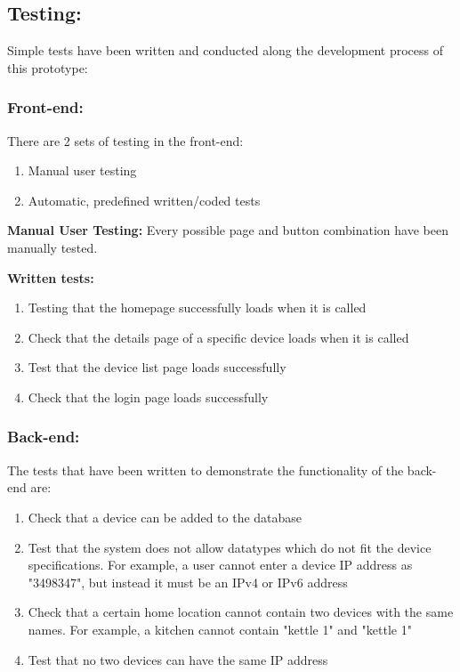 \documentclass[10pt,twocolumn]{witseiepaper}
\begin{document}
	\subsection{Testing:}
	Simple tests have been written and conducted along the development process of this prototype: 
	
	\subsubsection{Front-end:}
	There are 2 sets of testing in the front-end: 
	\begin{enumerate}
		\item Manual user testing
		\item Automatic, predefined written/coded tests
	\end{enumerate}
	
	\textbf{Manual User Testing:}
	Every possible page and button combination have been manually tested. 
	
	\textbf{Written tests:}
	\begin{enumerate}
		\item Testing that the homepage successfully loads when it is called
		\item Check that the details page of a specific device loads when it is called
		\item Test that the device list page loads successfully
		\item Check that the login page loads successfully
	\end{enumerate}	
	
	\subsubsection{Back-end:}
	The tests that have been written to demonstrate the functionality of the back-end are: 
	\begin{enumerate}
		\item Check that a device can be added to the database
		\item Test that the system does not allow datatypes which do not fit the device specifications. For example, a user cannot enter a device IP address as "3498347", but instead it must be an IPv4 or IPv6 address
		\item Check that a certain home location cannot contain two devices with the same names. For example, a kitchen cannot contain "kettle 1" and "kettle 1" 
		\item Test that no two devices can have the same IP address
	\end{enumerate}
	
\end{document}
